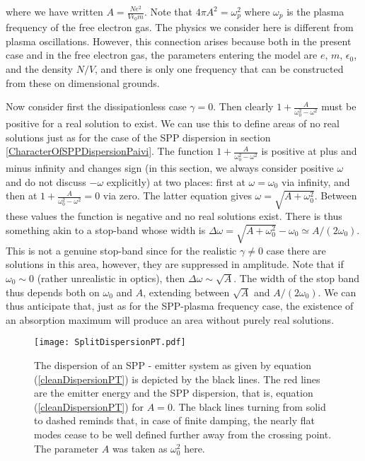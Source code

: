 \documentclass[12pt]{iopart}
\begin{document}
\noindent where we have written $A = \frac{N e^2}{V \epsilon_0 m}$. Note that $4\pi A^2 = \omega_p^2$ where $\omega_p$ is the plasma frequency of the free electron gas. The physics we consider here is different from plasma oscillations. However, this connection arises because both in the present case and in the free electron gas, the parameters entering the model are $e$, $m$, $\epsilon_0$, 
and the density $N/V$, and there is only one frequency that can be constructed from these on dimensional grounds.   

Now consider first the dissipationless case $\gamma = 0$. Then clearly $1 + \frac{A}{ \omega_0^2 - \omega^2}$ must be positive for a real solution to exist. We can use this to define areas of no real solutions just as for the case of the SPP dispersion in section \ref{CharacterOfSPPDispersionPaivi}. The function $1 + \frac{A}{ \omega_0^2 - \omega^2}$ is positive at plus and minus infinity and changes sign (in this section, we always consider positive $\omega$ and do not discuss $-\omega$ explicitly) at two places: first at $\omega=\omega_0$ via infinity, and then at $1 + \frac{A}{ \omega_0^2 - \omega^2}=0$ via zero. The latter equation gives $\omega = 
\sqrt{A + \omega_0^2}$. Between these values the function is negative and no real solutions exist. There is thus something akin to a stop-band whose width is $\Delta \omega = \sqrt{A + \omega_0^2} - \omega_0 \simeq A/(2\omega_0)$. This is not a genuine stop-band since for the realistic $\gamma\neq0$ case there are solutions in this area, however, they are suppressed in amplitude. Note that if $\omega_0\sim0$ (rather unrealistic in optics), then $\Delta \omega \sim \sqrt{A}$. The width of the stop band thus depends both on $\omega_0$ and $A$, extending between $\sqrt{A}$ and $A/(2\omega_0)$. We can thus anticipate that, just as for the SPP-plasma frequency case, the existence of an absorption maximum will produce an area without purely real solutions.

\begin{figure}
\texttt{[image: SplitDispersionPT.pdf]}
\caption{The dispersion of an SPP - emitter system as given by equation (\ref{cleanDispersionPT}) is depicted by the black lines. The red lines are the emitter energy and the SPP dispersion, that is, equation (\ref{cleanDispersionPT}) for $A=0$. The black lines turning from solid to dashed reminds that, in case of finite damping, the nearly flat modes cease to be well defined further away from the crossing point. The parameter $A$ was taken as $\omega_0^2$ here.} 
\label{SPPavoidedScetch}
\end{figure}
\end{document}
